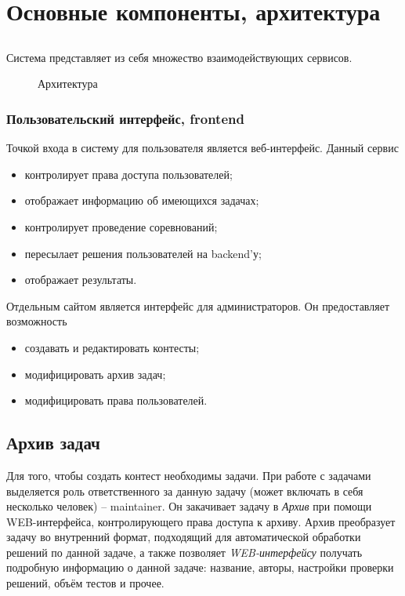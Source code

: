 \chapter{Основные компоненты, архитектура}

\section{}
Система представляет из себя множество взаимодействующих сервисов.

\begin{figure}[H]
\resizebox{\columnwidth}{!}{
    
}
\label{fig:systemdesign}
\caption{Архитектура}
\end{figure}

\subsection{Пользовательский интерфейс, frontend}
Точкой входа в систему для пользователя является веб-интерфейс.
Данный сервис 
\begin{itemize}
    \item контролирует права доступа пользователей;
    \item отображает информацию об имеющихся задачах;
    \item контролирует проведение соревнований;
    \item пересылает решения пользователей на backend'у;
    \item отображает результаты.
\end{itemize}

Отдельным сайтом является интерфейс для администраторов.
Он предоставляет возможность
\begin{itemize}
    \item создавать и редактировать контесты;
    \item модифицировать архив задач;
    \item модифицировать права пользователей.
\end{itemize}

\section{Архив задач}
Для того, чтобы создать контест необходимы задачи.
При работе с задачами выделяется роль ответственного за данную задачу (может включать в себя
несколько человек) -- maintainer. Он закачивает задачу в \textit{Архив} при помощи WEB-интерфейса,
контролирующего права доступа к архиву. Архив преобразует задачу во внутренний формат,
подходящий для автоматической обработки решений по данной задаче, а также позволяет
\textit{WEB-интерфейсу} получать подробную информацию о данной задаче:
название, авторы, настройки проверки решений, объём тестов и прочее.

